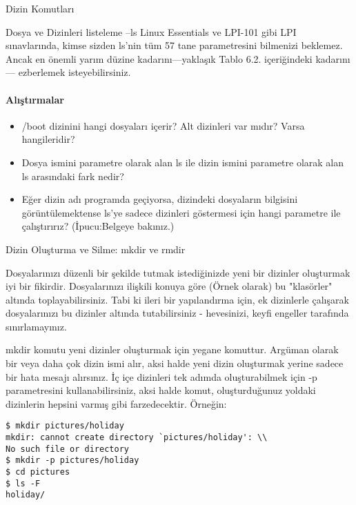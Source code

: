 \documentclass[10pt,a5paper]{book}
\begin{document}
\begin{section}{Dizin Komutları}
\begin{subsection}{Dosya ve Dizinleri listeleme --ls}
Linux Essentials ve LPI-101 gibi LPI sınavlarında, kimse sizden ls'nin tüm 57 tane parametresini bilmenizi beklemez. Ancak en önemli yarım düzine kadarını—yaklaşık Tablo 6.2. içeriğindeki kadarını— ezberlemek isteyebilirsiniz.
\paragraph{Alıştırmalar}{
\begin{itemize}
 \item /boot dizinini hangi dosyaları içerir? Alt dizinleri var mıdır? Varsa hangileridir?
 \item Dosya ismini parametre olarak alan ls ile dizin ismini parametre olarak alan ls arasındaki fark nedir?
 \item Eğer dizin adı programda geçiyorsa, dizindeki dosyaların bilgisini görüntülemektense ls'ye sadece dizinleri göstermesi için hangi parametre ile çalıştırırız? (İpucu:Belgeye bakınız.)
\end{itemize}}
\end{subsection}
\begin{subsection}{Dizin Oluşturma ve Silme: mkdir ve rmdir}

Dosyalarınızı düzenli bir şekilde tutmak istediğinizde yeni bir dizinler oluşturmak iyi bir fikirdir. Dosyalarınızı ilişkili konuya göre (Örnek olarak) bu "klasörler" altında toplayabilirsiniz. Tabi ki ileri bir yapılandırma için, ek dizinlerle çalışarak dosyalarınızı bu dizinler altında tutabilirsiniz - hevesinizi, keyfi engeller tarafında sınırlamayınız.

mkdir komutu yeni dizinler oluşturmak için yegane komuttur. Argüman olarak bir veya daha çok dizin ismi alır, aksi halde yeni dizin oluşturmak yerine sadece bir hata mesajı alırsınız. İç içe dizinleri tek adımda oluşturabilmek için -p parametresini kullanabilirsiniz, aksi halde komut, oluşturduğunuz yoldaki dizinlerin hepsini varmış gibi farzedecektir. Örneğin:
\begin{verbatim}
$ mkdir pictures/holiday
mkdir: cannot create directory `pictures/holiday': \\
No such file or directory
$ mkdir -p pictures/holiday
$ cd pictures
$ ls -F
holiday/
\end{verbatim}
\end{subsection}
\end{section}
\end{document}
